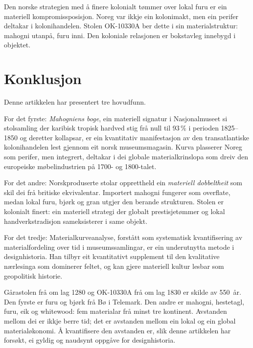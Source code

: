 \documentclass[12pt,a4paper]{article}
\begin{document}
Den norske strategien med å finere kolonialt t\o{}mmer over lokal furu er ein materiell kompromissposisjon. Noreg var ikkje ein kolonimakt, men ein perifer deltakar i kolonihandelen. Stolen OK-10330A ber dette i sin materialstruktur: mahogni utanp\aa{}, furu inni. Den koloniale relasjonen er bokstavleg innebygd i objektet.

\section{Konklusjon}

Denne artikkelen har presentert tre hovudfunn.

For det fyrste: \emph{Mahogniens boge}, ein materiell signatur i Nasjonalmuseet si stolsamling der karibisk tropisk hardved stig fr\aa{} null til 93\,\% i perioden 1825--1850 og deretter kollapsar, er ein kvantitativ manifestasjon av den transatlantiske kolonihandelen lest gjennom eit norsk museumsmagasin. Kurva plasserer Noreg som perifer, men integrert, deltakar i dei globale materialkrinslopa som dreiv den europeiske m\o{}belindustrien p\aa{} 1700- og 1800-talet.

For det andre: Norskproduserte stolar opprettheld ein \emph{materiell dobbeltheit} som skil dei fr\aa{} britiske ekvivalentar. Importert mahogni fungerer som overflate, medan lokal furu, bj\o{}rk og gran utgjer den berande strukturen. Stolen er kolonialt finert: ein materiell strategi der globalt prestisjet\o{}mmer og lokal handverkstradisjon sameksisterer i same objekt.

For det tredje: Materialkurveanalyse, forst\aa{}tt som systematisk kvantifisering av materialfordeling over tid i museumssamlingar, er ein underutnytta metode i designhistoria. Han tilbyr eit kvantitativt supplement til den kvalitative n\ae{}rlesinga som dominerer feltet, og kan gjere materiell kultur lesbar som geopolitisk historie.

G\aa{}rastolen fr\aa{} om lag 1280 og OK-10330A fr\aa{} om lag 1830 er skilde av 550~\aa{}r. Den fyrste er furu og bj\o{}rk fr\aa{} B\o{} i Telemark. Den andre er mahogni, hestetagl, furu, eik og whitewood: fem materialar fr\aa{} minst tre kontinent. Avstanden mellom dei er ikkje berre tid; det er avstanden mellom ein lokal og ein global material\o{}konomi. \AA{} kvantifisere den avstanden er, slik denne artikkelen har fors\o{}kt, ei gyldig og naudsynt oppg\aa{}ve for designhistoria.



\end{document}
